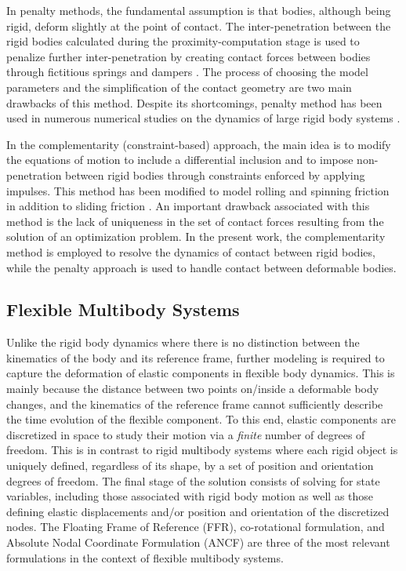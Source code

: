 In penalty methods, the fundamental assumption is that bodies, although being rigid, deform slightly at the point of contact. The inter-penetration between the rigid bodies calculated during the proximity-computation stage is used to penalize further inter-penetration by creating contact forces between bodies through fictitious springs and dampers \cite{cundall71,cundall79,cundall1988formulation}. The process of choosing the model parameters and the simplification of the contact geometry are two main drawbacks of this method. Despite its shortcomings, penalty method has been used in numerous numerical studies on the dynamics of large rigid body systems \cite{Jaeger1996,brilliantov1996model,vu1999elastoplastic,vu2004accurate,luding2005,poschel2005computational}.

In the complementarity (constraint-based) approach, the main idea is to modify the equations of motion to include a differential inclusion \cite{filippov1967classical} and to impose non-penetration between rigid bodies through constraints enforced by applying impulses.  This method has been modified to model rolling and spinning friction in addition to sliding friction \cite{AleMihaiFriction2013}.  An important drawback associated with this method is the lack of uniqueness in the set of contact forces resulting from the solution of an optimization problem. In the present work, the complementarity method is employed to resolve the dynamics of contact between rigid bodies, while the penalty approach is used to handle contact between deformable bodies.


\subsection{Flexible Multibody Systems}
Unlike the rigid body dynamics where there is no distinction between the kinematics of the body and its reference frame, further modeling is required to capture the deformation of elastic components in flexible body dynamics. This is mainly because the distance between two points on/inside a deformable body changes, and the kinematics of the reference frame cannot sufficiently describe the time evolution of the flexible component. To this end, elastic components are discretized in space to study their motion via a \textit{finite} number of degrees of freedom. This is in contrast to rigid multibody systems where each rigid object is uniquely defined, regardless of its shape, by a set of position and orientation degrees of freedom. The final stage of the solution consists of solving for state variables, including those associated with rigid body motion as well as those defining elastic displacements and/or position and orientation of the discretized nodes.  The Floating Frame of Reference (FFR), co-rotational formulation, and Absolute Nodal Coordinate Formulation (ANCF) are three of the most relevant formulations in the context of flexible multibody systems. 


